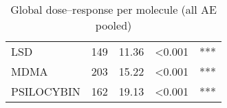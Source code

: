 \begin{table}[!h]
\centering
\caption{Global dose–response per molecule (all AE pooled)}
\centering
\begin{tabular}[t]{lrlll}
\toprule
LSD & 149 & 11.36 & <0.001 & ***\\
MDMA & 203 & 15.22 & <0.001 & ***\\
PSILOCYBIN & 162 & 19.13 & <0.001 & ***\\
\bottomrule
\end{tabular}
\end{table}
